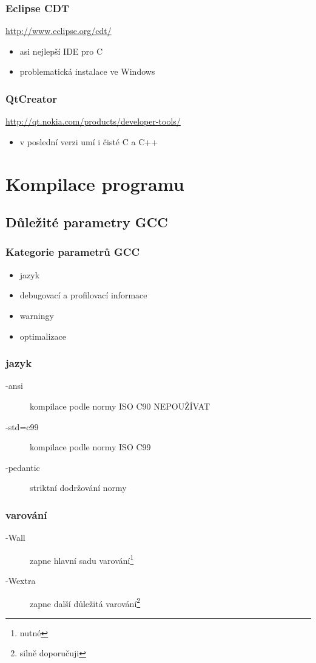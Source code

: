 	\begin{frame}
		\frametitle{Eclipse CDT}
		\url{http://www.eclipse.org/cdt/}
		\begin{itemize}
			\item{asi nejlepší IDE pro C}
			\item{problematická instalace ve Windows}
		\end{itemize}
	\end{frame}

	\begin{frame}
		\frametitle{QtCreator}
		\url{http://qt.nokia.com/products/developer-tools/}
		\begin{itemize}
			\item{v poslední verzi umí i čisté C a C++}
		\end{itemize}
	\end{frame}

	\section{Kompilace programu}
	\subsection{Důležité parametry GCC}

	\begin{frame}
		\frametitle{Kategorie parametrů GCC}
		\begin{itemize}
			\item{jazyk}
			\item{debugovací a profilovací informace}
			\item{warningy}
			\item{optimalizace}
		\end{itemize}
	\end{frame}

	\begin{frame}
		\frametitle{jazyk}
		\begin{description}
			\item[-ansi]{kompilace podle normy ISO C90 \alert{NEPOUŽÍVAT}}
			\item[-std=c99]{kompilace podle normy ISO C99}
			\item[-pedantic]{striktní dodržování normy}
		\end{description}
	\end{frame}

	\begin{frame}
		\frametitle{varování}
		\begin{description}
			\item[-Wall]{zapne hlavní sadu varování\footnote{\alert{nutné}}}
			\item[-Wextra]{zapne další důležitá varování\footnote{silně doporučuji}} 
		\end{description}
	\end{frame}

